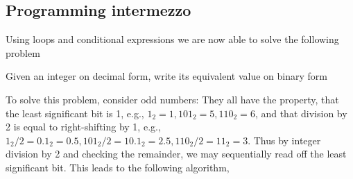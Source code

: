 \subsection{Programming intermezzo}
Using loops and conditional expressions we are now able to solve the following problem
\begin{problem}
  Given an integer on decimal form, write its equivalent value on binary form
\end{problem}
To solve this problem, consider odd numbers: They all have the property, that the least significant bit is 1, e.g., $1_2 = 1, 101_2 = 5, 110_2 = 6$, and that division by 2 is equal to right-shifting by 1, e.g., $1_2/2 = 0.1_2 = 0.5, 101_2/2 = 10.1_2 = 2.5, 110_2/2 = 11_2 = 3$. Thus by integer division by 2 and checking the remainder, we may sequentially read off the least significant bit. This leads to the following algorithm,
%
%




